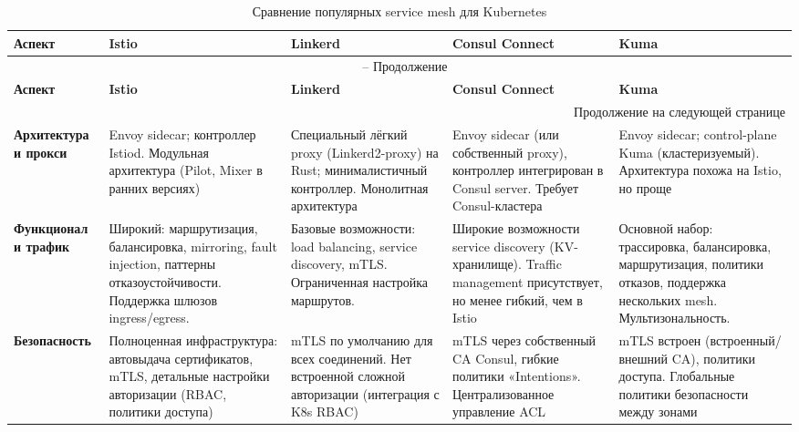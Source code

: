 \begingroup
\small
\setlength{\tabcolsep}{4pt} %
\begin{longtable}{|p{2.6cm}|p{3.3cm}|p{3.3cm}|p{3.3cm}|p{3.3cm}|}
\caption{Сравнение популярных service mesh для Kubernetes} \label{tab:meshes} \\
\hline
\textbf{Аспект} & \textbf{Istio} & \textbf{Linkerd} & \textbf{Consul Connect} & \textbf{Kuma} \\
\hline
\endfirsthead

\multicolumn{5}{c}{\tablename\ \thetable{} -- Продолжение} \\
\hline
\textbf{Аспект} & \textbf{Istio} & \textbf{Linkerd} & \textbf{Consul Connect} & \textbf{Kuma} \\
\hline
\endhead

\hline \multicolumn{5}{r}{{Продолжение на следующей странице}} \\
\endfoot

\hline
\endlastfoot

\textbf{Архитектура и прокси} & 
Envoy sidecar; контроллер Istiod. Модульная архитектура (Pilot, Mixer в ранних версиях) & 
Специальный лёгкий proxy (Linkerd2-proxy) на Rust; минималистичный контроллер. Монолитная архитектура & 
Envoy sidecar (или собственный proxy), контроллер интегрирован в Consul server. Требует Consul-кластера & 
Envoy sidecar; control-plane Kuma (кластеризуемый). Архитектура похожа на Istio, но проще \\
\hline

\textbf{Функционал и трафик} & 
Широкий: маршрутизация, балансировка, mirroring, fault injection, паттерны отказоустойчивости. Поддержка шлюзов ingress/egress. & 
Базовые возможности: load balancing, service discovery, mTLS. Ограниченная настройка маршрутов. & 
Широкие возможности service discovery (KV-хранилище). Traffic management присутствует, но менее гибкий, чем в Istio & 
Основной набор: трассировка, балансировка, маршрутизация, политики отказов, поддержка нескольких mesh. Мультизональность. \\
\hline

\textbf{Безопасность} & 
Полноценная инфраструктура: автовыдача сертификатов, mTLS, детальные настройки авторизации (RBAC, политики доступа) & 
mTLS по умолчанию для всех соединений. Нет встроенной сложной авторизации (интеграция с K8s RBAC) & 
mTLS через собственный CA Consul, гибкие политики «Intentions». Централизованное управление ACL & 
mTLS встроен (встроенный/внешний CA), политики доступа. Глобальные политики безопасности между зонами \\
\hline


\end{longtable}
